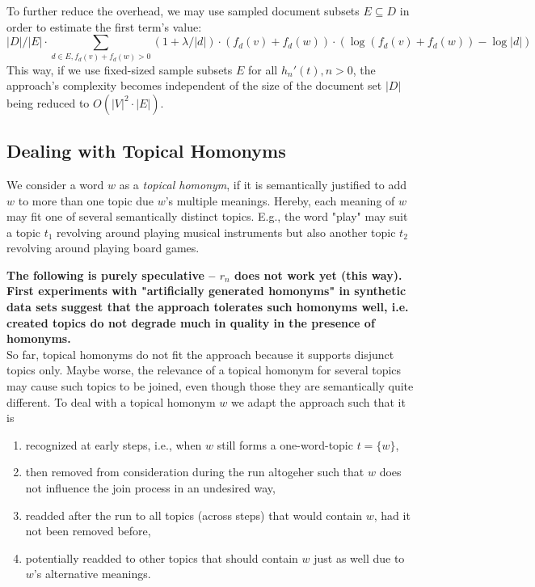 \documentclass[10pt, a4paper, oneside]{article}
\begin{document}
To further reduce the overhead, we may use sampled document subsets $E \subseteq D$ in order to estimate the first term's value:
\[|D| / |E| \cdot \sum_{d \in E, f_d(v) + f_d(w) > 0} (1 + \lambda / |d|) \cdot (f_d(v) + f_d(w)) \cdot (\log (f_d(v) + f_d(w)) - \log |d|)\] 
This way, if we use fixed-sized sample subsets $E$ for all $h_n'(t), n > 0$, the approach's complexity becomes independent of the size of the document set $|D|$ being reduced to $O(|V|^2 \cdot |E|)$.

\subsection{Dealing with Topical Homonyms}

We consider a word $w$ as a \emph{topical homonym}, if it is semantically justified to add $w$ to more than one topic due $w$'s multiple meanings. Hereby, each meaning of $w$ may fit one of several semantically distinct topics. E.g., the word "play" may suit a topic $t_1$ revolving around playing musical instruments but also another topic $t_2$ revolving around playing board games. 

\textbf{The following is purely speculative -- $r_n$ does not work yet (this way). First experiments with "artificially generated homonyms" in synthetic data sets suggest that the approach tolerates such homonyms well, i.e. created topics do not degrade much in quality in the presence of homonyms.}\\

So far, topical homonyms do not fit the approach because it supports disjunct topics only. Maybe worse, the relevance of a topical homonym for several topics may cause such topics to be joined, even though those they are semantically quite different. To deal with a topical homonym $w$ we adapt the approach such that it is
\begin{enumerate}
\item recognized at early steps, i.e., when $w$ still forms a one-word-topic $t = \{ w\}$,
\item then removed from consideration during the run altogeher such that $w$ does not influence the join process in an undesired way,
\item readded after the run to all topics (across steps) that would contain $w$, had it not been removed before,
\item potentially readded to other topics that should contain $w$ just as well due to $w$'s alternative meanings.
\end{enumerate}
\end{document}
